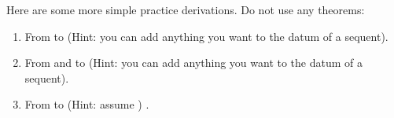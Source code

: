 Here are some more simple practice derivations. Do not use any theorems:

\begin{enumerate}
 \cover{\setlength{\itemsep}{5em}}
 \item 

 From  to  (Hint: you can add 
 anything you want to the datum of a sequent).

 \opts{

  \dotline
  \dotline
  \dotline
  \dotline
  \dotline
  \dotline
  \dotline
  \dotline
  \dotline
  \dotline

 }
 {

\begin{argumentN}[1]




\end{argumentN}
}

\item

 From  and  to  (Hint: you can add anything you want to the datum of a sequent).

 \opts{

  \dotline
  \dotline
  \dotline
  \dotline
  \dotline
  \dotline
  \dotline
  \dotline
  \dotline
  \dotline
  \dotline
  \dotline

 }
 {

\begin{argumentN}[1]







\end{argumentN}

}

\newpage
\item

 From  to  (Hint: assume 
 )
 .


\end{enumerate}
